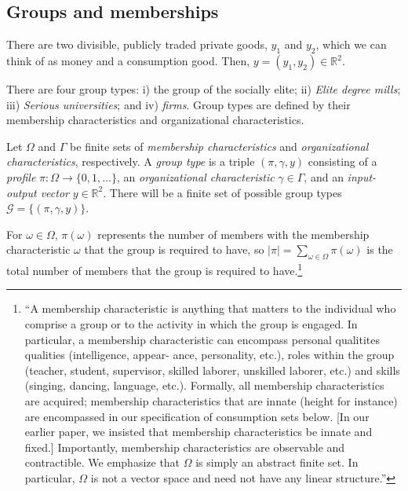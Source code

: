 \documentclass[12pt,letterpaper]{article}
\begin{document}
	\subsection{Groups and memberships}
	There are two divisible, publicly traded private goods, $y_1$ and $y_2$, which we can think of as money and a consumption good. Then, $y=(y_1,y_2)\in\mathbb{R}^2$.
	
	There are four group types: i) the group of the socially elite; ii) \textit{Elite degree mills}; iii) \textit{Serious universities}; and iv) \textit{firms}.
	Group types are defined by their membership characteristics and organizational characteristics.
	
	Let $\Omega$ and $\Gamma$ be finite sets of \textit{membership characteristics} and \textit{organizational characteristics}, respectively. 
	A \textit{group type} is a triple $(\pi,\gamma,y)$ consisting of a \textit{profile} $\pi:\Omega\rightarrow\{0,1,\ldots\}$, an \textit{organizational characteristic} $\gamma\in\Gamma$, and an \textit{input-output vector} $y\in\mathbb{R}^2$.
	There will be a finite set of possible group types $\mathcal{G}=\{(\pi,\gamma,y)\}$.
	
	For $\omega\in \Omega$, $\pi(\omega)$ represents the number of members with the membership characteristic $\omega$ that the group is required to have, so $|\pi|=\sum_{\omega\in\Omega}\pi(\omega)$ is the total number of members that the group is required to have.\footnote
		{
		``A membership characteristic is anything that matters to the individual who comprise a group or to the activity in which the group is engaged. In particular, a membership characteristic can encompass personal qualitites qualities (intelligence, appear- ance, personality, etc.), roles within the group (teacher, student, supervisor, skilled laborer, unskilled laborer, etc.) and skills (singing, dancing, language, etc.). Formally, all membership characteristics are acquired; membership characteristics that are innate (height for instance) are encompassed in our speciﬁcation of consumption sets below. [In our earlier paper, we insisted that membership characteristics be innate and ﬁxed.] Importantly, membership characteristics are observable and contractible. We emphasize that $\Omega$ is simply an abstract ﬁnite set. In particular, $\Omega$ is not a vector space and need not have any linear structure.''
	}
	
\end{document}
